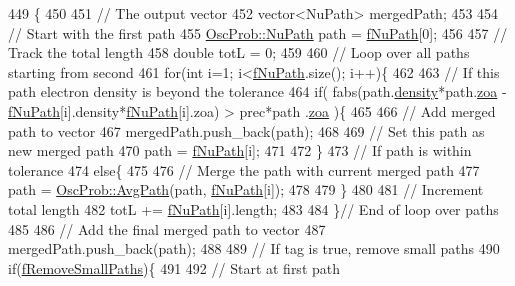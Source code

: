 \begin{DoxyCode}
449                                                    \{
450 
451   \textcolor{comment}{// The output vector}
452   vector<NuPath> mergedPath;
453 
454   \textcolor{comment}{// Start with the first path}
455   \hyperlink{structOscProb_1_1NuPath}{OscProb::NuPath} path = \hyperlink{classOscProb_1_1PremModel_aaf3c77e35798d664853157013c90ad2b}{fNuPath}[0];
456 
457   \textcolor{comment}{// Track the total length}
458   \textcolor{keywordtype}{double} totL = 0;
459 
460   \textcolor{comment}{// Loop over all paths starting from second}
461   \textcolor{keywordflow}{for}(\textcolor{keywordtype}{int} i=1; i<\hyperlink{classOscProb_1_1PremModel_aaf3c77e35798d664853157013c90ad2b}{fNuPath}.size(); i++)\{
462 
463     \textcolor{comment}{// If this path electron density is beyond the tolerance}
464     \textcolor{keywordflow}{if}( fabs(path.\hyperlink{structOscProb_1_1NuPath_a54ddd451db69bc54434de3cf18a117ca}{density}*path.\hyperlink{structOscProb_1_1NuPath_af3213f3691ba83c6bc05f4a3490f6b31}{zoa} - \hyperlink{classOscProb_1_1PremModel_aaf3c77e35798d664853157013c90ad2b}{fNuPath}[i].density*\hyperlink{classOscProb_1_1PremModel_aaf3c77e35798d664853157013c90ad2b}{fNuPath}[i].zoa) > prec*path
      .\hyperlink{structOscProb_1_1NuPath_af3213f3691ba83c6bc05f4a3490f6b31}{zoa} )\{
465 
466       \textcolor{comment}{// Add merged path to vector}
467       mergedPath.push\_back(path);
468 
469       \textcolor{comment}{// Set this path as new merged path}
470       path = \hyperlink{classOscProb_1_1PremModel_aaf3c77e35798d664853157013c90ad2b}{fNuPath}[i];
471 
472     \}
473     \textcolor{comment}{// If path is within tolerance}
474     \textcolor{keywordflow}{else}\{
475 
476       \textcolor{comment}{// Merge the path with current merged path}
477       path = \hyperlink{namespaceOscProb_a999a7944bad8bc72d7ee9f56f81a210e}{OscProb::AvgPath}(path, \hyperlink{classOscProb_1_1PremModel_aaf3c77e35798d664853157013c90ad2b}{fNuPath}[i]);
478 
479     \}
480 
481     \textcolor{comment}{// Increment total length}
482     totL += \hyperlink{classOscProb_1_1PremModel_aaf3c77e35798d664853157013c90ad2b}{fNuPath}[i].length;
483 
484   \}\textcolor{comment}{// End of loop over paths}
485 
486   \textcolor{comment}{// Add the final merged path to vector}
487   mergedPath.push\_back(path);
488 
489   \textcolor{comment}{// If tag is true, remove small paths}
490   \textcolor{keywordflow}{if}(\hyperlink{classOscProb_1_1PremModel_a3973df6f5f2ff219cd2f865b31aacfd2}{fRemoveSmallPaths})\{
491 
492     \textcolor{comment}{// Start at first path}

\end{DoxyCode}
